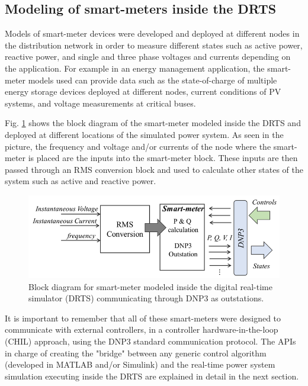 \subsection{Modeling of smart-meters inside the DRTS}
Models of smart-meter devices were developed and deployed at different nodes in the distribution network in order to measure different states such as active power, reactive power, and single and three phase voltages and currents depending on the application. For example in an energy management application, the smart-meter models used can provide data such as the state-of-charge of multiple energy storage devices deployed at different nodes, current conditions of PV systems, and voltage measurements at critical buses.

Fig. \ref{fig:sm_meter} shows the block diagram of the smart-meter modeled inside the DRTS and deployed at different locations of the simulated power system. As seen in the picture, the frequency and voltage and/or currents of the node where the smart-meter is placed are the inputs into the smart-meter block. These inputs are then passed through an RMS conversion block and used to calculate other states of the system such as active and reactive power.

\begin{figure}[!ht]
    \centering
    \includegraphics[width = \linewidth]{figs/SMART_METER.png}
    \caption{Block diagram for smart-meter modeled inside the digital real-time simulator (DRTS) communicating through DNP3 as outstations.}
    \label{fig:sm_meter}
\end{figure}



It is important to remember that all of these smart-meters were designed to communicate with external controllers, in a controller hardware-in-the-loop (CHIL) approach, using the DNP3 standard communication protocol. The APIs in charge of creating the "bridge" between any generic control algorithm (developed in MATLAB and/or Simulink) and the real-time power system simulation executing inside the DRTS are explained in detail in the next section. 



